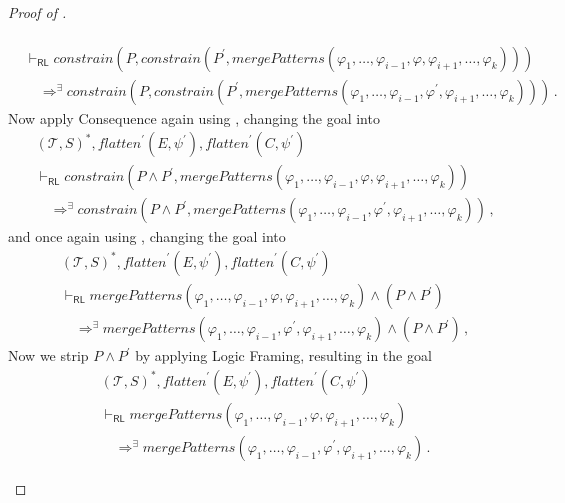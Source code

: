\documentclass{article}
\newcommand{\RL}{\mathsf{RL}}
\begin{document}
\begin{proof}[Proof of ]
\begin{enumerate}
\begin{align*}
        \\& \vdash_\RL
        \mathit{constrain}(P, \mathit{constrain}(P^\prime, \mathit{mergePatterns}(\varphi_1, \ldots, \varphi_{i-1}, \varphi, \varphi_{i+1}, \ldots, \varphi_k)))
        \\&\quad \Rightarrow^\exists
        \mathit{constrain}(P, \mathit{constrain}(P^\prime, \mathit{mergePatterns}(\varphi_1, \ldots, \varphi_{i-1}, \varphi^\prime, \varphi_{i+1}, \ldots, \varphi_k))) \, .
    \end{align*}
    Now apply Consequence again using ,
    changing the goal into
    \begin{align*}
        & (\mathcal{T}, S)^*, \mathit{flatten}^\prime(E, \psi^\prime), \mathit{flatten}^\prime(C, \psi^\prime)
        \\& \vdash_\RL
        \mathit{constrain}(P \land P^\prime, \mathit{mergePatterns}(\varphi_1, \ldots, \varphi_{i-1}, \varphi, \varphi_{i+1}, \ldots, \varphi_k))
        \\&\quad \Rightarrow^\exists
        \mathit{constrain}(P \land P^\prime, \mathit{mergePatterns}(\varphi_1, \ldots, \varphi_{i-1}, \varphi^\prime, \varphi_{i+1}, \ldots, \varphi_k)) \, ,
    \end{align*}
    and once again using , changing the goal into
    \begin{align*}
        & (\mathcal{T}, S)^*, \mathit{flatten}^\prime(E, \psi^\prime), \mathit{flatten}^\prime(C, \psi^\prime)
        \\& \vdash_\RL
        \mathit{mergePatterns}(\varphi_1, \ldots, \varphi_{i-1}, \varphi, \varphi_{i+1}, \ldots, \varphi_k)
        \land (P \land P^\prime)
        \\&\quad \Rightarrow^\exists
        \mathit{mergePatterns}(\varphi_1, \ldots, \varphi_{i-1}, \varphi^\prime, \varphi_{i+1}, \ldots, \varphi_k) \land (P \land P^\prime) \, ,
    \end{align*}
    Now we strip $P \land P^\prime$ by applying Logic Framing, resulting in the goal
    \begin{align*}
        & (\mathcal{T}, S)^*, \mathit{flatten}^\prime(E, \psi^\prime), \mathit{flatten}^\prime(C, \psi^\prime)
        \\& \vdash_\RL
        \mathit{mergePatterns}(\varphi_1, \ldots, \varphi_{i-1}, \varphi, \varphi_{i+1}, \ldots, \varphi_k)
        \\&\quad \Rightarrow^\exists
        \mathit{mergePatterns}(\varphi_1, \ldots, \varphi_{i-1}, \varphi^\prime, \varphi_{i+1}, \ldots, \varphi_k) \, .

\end{align*}
\end{enumerate}
\end{proof}
\end{document}
